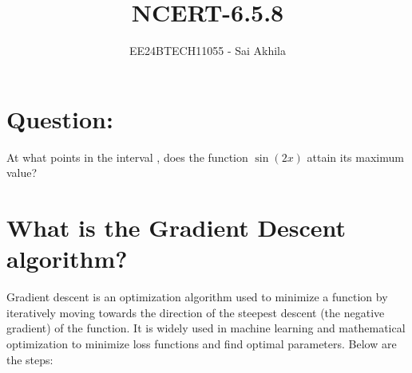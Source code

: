 \documentclass[journal]{IEEEtran}
\begin{document}

\vspace{3cm}

\title{NCERT-6.5.8}
\author{EE24BTECH11055 - Sai Akhila}
{\let\newpage\relax\maketitle}

\renewcommand{\thefigure}{\theenumi}
\renewcommand{\thetable}{\theenumi}
\setlength{\intextsep}{10pt} %


\renewcommand{\thetable}{\theenumi}

\section*{Question:}
At what points in the interval , does the function $\sin(2x)$ attain its maximum value?
\section*{What is the Gradient Descent algorithm?}
Gradient descent is an optimization algorithm used to minimize a function by iteratively moving towards the direction of the steepest descent (the negative gradient) of the function. It is widely used in machine learning and mathematical optimization to minimize loss functions and find optimal parameters.
Below are the steps:\\
\end{document}
